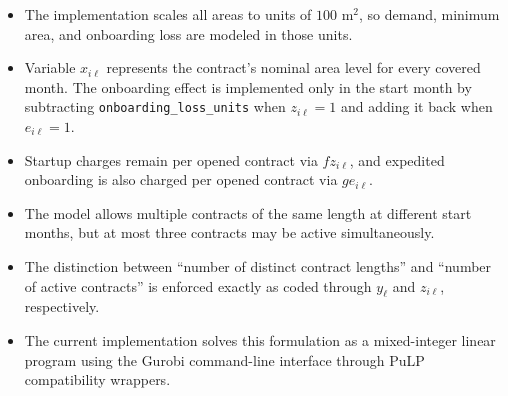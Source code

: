 \begin{itemize}
\item The implementation scales all areas to units of $100\text{ m}^2$, so demand, minimum area, and onboarding loss are modeled in those units.
\item Variable $x_{i\ell}$ represents the contract's nominal area level for every covered month. The onboarding effect is implemented only in the start month by subtracting \texttt{onboarding\_loss\_units} when $z_{i\ell}=1$ and adding it back when $e_{i\ell}=1$.
\item Startup charges remain per opened contract via $f z_{i\ell}$, and expedited onboarding is also charged per opened contract via $g e_{i\ell}$.
\item The model allows multiple contracts of the same length at different start months, but at most three contracts may be active simultaneously.
\item The distinction between ``number of distinct contract lengths'' and ``number of active contracts'' is enforced exactly as coded through $y_\ell$ and $z_{i\ell}$, respectively.
\item The current implementation solves this formulation as a mixed-integer linear program using the Gurobi command-line interface through PuLP compatibility wrappers.
\end{itemize}
